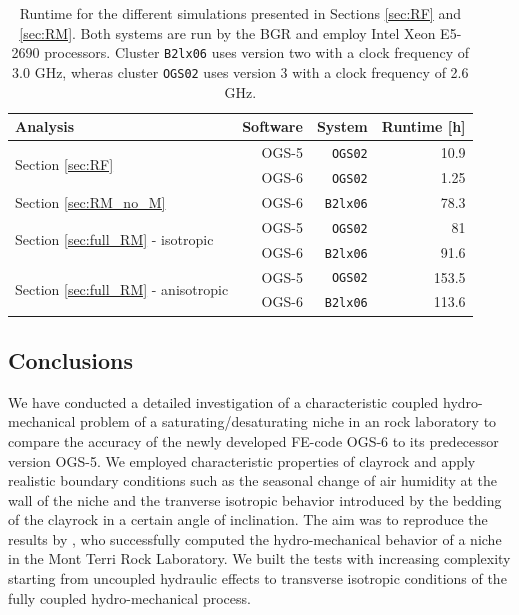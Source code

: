 \begin{table}
 \caption{Runtime for the different simulations presented in Sections \ref{sec:RF} and \ref{sec:RM}. Both systems are run by the BGR and employ Intel Xeon E5-2690 processors. Cluster \texttt{B2lx06} uses version two  with a clock frequency of 3.0 GHz, wheras cluster \texttt{OGS02} uses version 3 with a clock frequency of 2.6 GHz. \label{tab:runtime}}
\begin{center}
\begin{tabular}{ l | r | r | r  }
 Analysis		&  Software & System & Runtime [h]\\ 
 \hline
 \multirow{2}{*}{Section \ref{sec:RF}} 	& OGS-5 & \texttt{OGS02} & 10.9\\
 									& OGS-6 & \texttt{OGS02} &  1.25\\
 \hline 										
 Section \ref{sec:RM_no_M}	& OGS-6 & \texttt{B2lx06} & 78.3\\
 \hline
 \multirow{2}{*}{Section \ref{sec:full_RM} - isotropic} & OGS-5 & \texttt{OGS02} & 81\\
& OGS-6 & \texttt{B2lx06} & 91.6 \\
 \hline
 \multirow{2}{*}{Section  \ref{sec:full_RM} - anisotropic}  & OGS-5 & \texttt{OGS02} & 153.5\\
& OGS-6 & \texttt{B2lx06} & 113.6 \\
\end{tabular}
\end{center}
\end{table}

\subsection{Conclusions}

We have conducted a detailed investigation of a characteristic coupled hydro-mechanical problem of a saturating/desaturating niche in an rock laboratory to compare the accuracy of the newly developed FE-code OGS-6 to its predecessor version OGS-5. We employed characteristic properties of clayrock and apply realistic boundary conditions such as the seasonal change of air humidity  at the wall of the niche and the tranverse isotropic behavior introduced by the bedding of the clayrock in a certain angle of inclination. The aim was to reproduce the results by \cite{ziefle2018}, who successfully computed the hydro-mechanical behavior of a niche in the Mont Terri Rock Laboratory. We built the tests  with increasing complexity starting from uncoupled hydraulic effects to transverse isotropic conditions of the fully coupled hydro-mechanical process. 

